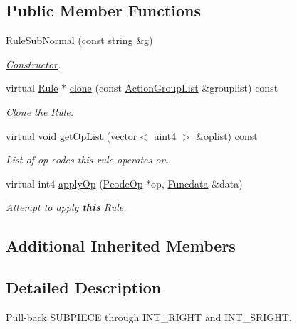 \subsection*{Public Member Functions}
\begin{DoxyCompactItemize}
\item 
\mbox{\hyperlink{class_rule_sub_normal_aaabb659e2cbb8be6923f8b6e7b379522}{Rule\+Sub\+Normal}} (const string \&g)
\begin{DoxyCompactList}\small\item\em \mbox{\hyperlink{class_constructor}{Constructor}}. \end{DoxyCompactList}\item 
virtual \mbox{\hyperlink{class_rule}{Rule}} $\ast$ \mbox{\hyperlink{class_rule_sub_normal_a04e245995224e1a60ab407ba3ad4696a}{clone}} (const \mbox{\hyperlink{class_action_group_list}{Action\+Group\+List}} \&grouplist) const
\begin{DoxyCompactList}\small\item\em Clone the \mbox{\hyperlink{class_rule}{Rule}}. \end{DoxyCompactList}\item 
virtual void \mbox{\hyperlink{class_rule_sub_normal_a18d6ecf9c6fd365f4f43f906782f101b}{get\+Op\+List}} (vector$<$ uint4 $>$ \&oplist) const
\begin{DoxyCompactList}\small\item\em List of op codes this rule operates on. \end{DoxyCompactList}\item 
virtual int4 \mbox{\hyperlink{class_rule_sub_normal_a257e214dcabe37990f299a02912c75c2}{apply\+Op}} (\mbox{\hyperlink{class_pcode_op}{Pcode\+Op}} $\ast$op, \mbox{\hyperlink{class_funcdata}{Funcdata}} \&data)
\begin{DoxyCompactList}\small\item\em Attempt to apply {\bfseries{this}} \mbox{\hyperlink{class_rule}{Rule}}. \end{DoxyCompactList}\end{DoxyCompactItemize}
\subsection*{Additional Inherited Members}


\subsection{Detailed Description}
Pull-\/back S\+U\+B\+P\+I\+E\+CE through I\+N\+T\+\_\+\+R\+I\+G\+HT and I\+N\+T\+\_\+\+S\+R\+I\+G\+HT. 

